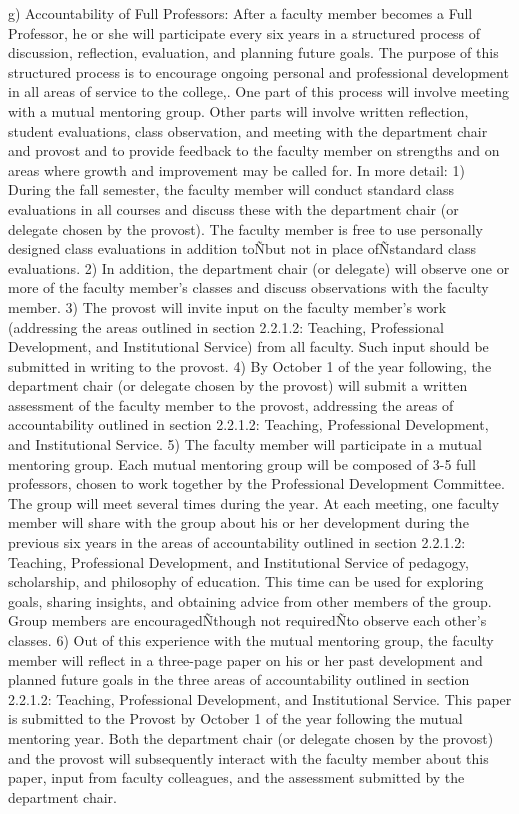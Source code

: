 \documentclass[letterpaper, 11pt]{article}
\begin{document}
			g) Accountability of Full Professors:  After a faculty member becomes a Full Professor, he or she will participate every six years in a structured process of discussion, reflection, evaluation, and planning future goals. The purpose of this structured process is to encourage ongoing personal and professional development in all areas of service to the college,. One part of this process will involve meeting with a mutual mentoring group. Other parts will involve written reflection, student evaluations, class observation, and meeting with the department chair and provost and to provide feedback to the faculty member on strengths and on areas where growth and improvement may be called for. In more detail:
			1) During the fall semester, the faculty member will conduct standard class evaluations in all courses and discuss these with the department chair (or delegate chosen by the provost). The faculty member is free to use personally designed class evaluations in addition toÑbut not in place ofÑstandard class evaluations.
			2) In addition, the department chair (or delegate) will observe one or more of the faculty member's classes and discuss observations with the faculty member.
			3) The provost will invite input on the faculty member's work (addressing the areas outlined in section 2.2.1.2: Teaching, Professional Development, and Institutional Service) from all faculty. Such input should be submitted in writing to the provost.
			4) By October 1 of the year following, the department chair (or delegate chosen by the provost) will submit a written assessment of the faculty member to the provost, addressing the areas of accountability outlined in section 2.2.1.2: Teaching, Professional Development, and Institutional Service.
			5) The faculty member will participate in a mutual mentoring group. Each mutual mentoring group will be composed of 3-5 full professors, chosen to work together by the Professional Development Committee. The group will meet several times during the year. At each meeting, one faculty member will share with the group about his or her development during the previous six years in the areas of accountability outlined in section 2.2.1.2: Teaching, Professional Development, and Institutional Service of pedagogy, scholarship, and philosophy of education. This time can be used for exploring goals, sharing insights, and obtaining advice from other members of the group. Group members are encouragedÑthough not requiredÑto observe each other's classes.
			6) Out of this experience with the mutual mentoring group, the faculty member will reflect in a three-page paper on his or her past development and planned future goals in the three areas of accountability outlined in section 2.2.1.2: Teaching, Professional Development, and Institutional Service. This paper is submitted to the Provost by October 1 of the year following the mutual mentoring year. Both the department chair (or delegate chosen by the provost) and the provost will subsequently interact with the faculty member about this paper, input from faculty colleagues, and the assessment submitted by the department chair.
\end{document}
